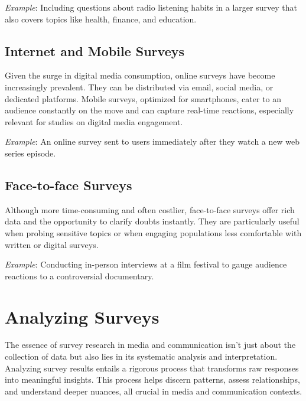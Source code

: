 \documentclass[
  b5paper]{book}
\begin{document}
\emph{Example}: Including questions about radio listening habits in a larger survey that also covers topics like health, finance, and education.

\hypertarget{internet-and-mobile-surveys}{%
\subsection*{Internet and Mobile Surveys}\label{internet-and-mobile-surveys}}

Given the surge in digital media consumption, online surveys have become increasingly prevalent.
They can be distributed via email, social media, or dedicated platforms.
Mobile surveys, optimized for smartphones, cater to an audience constantly on the move and can capture real-time reactions, especially relevant for studies on digital media engagement.

\emph{Example}: An online survey sent to users immediately after they watch a new web series episode.

\hypertarget{face-to-face-surveys}{%
\subsection*{Face-to-face Surveys}\label{face-to-face-surveys}}

Although more time-consuming and often costlier, face-to-face surveys offer rich data and the opportunity to clarify doubts instantly.
They are particularly useful when probing sensitive topics or when engaging populations less comfortable with written or digital surveys.

\emph{Example}: Conducting in-person interviews at a film festival to gauge audience reactions to a controversial documentary.

\hypertarget{analyzing-surveys}{%
\section{Analyzing Surveys}\label{analyzing-surveys}}

The essence of survey research in media and communication isn't just about the collection of data but also lies in its systematic analysis and interpretation.
Analyzing survey results entails a rigorous process that transforms raw responses into meaningful insights.
This process helps discern patterns, assess relationships, and understand deeper nuances, all crucial in media and communication contexts.
\end{document}
